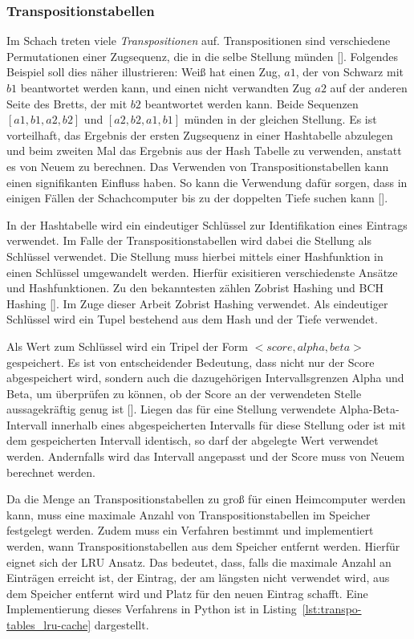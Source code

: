 \subsubsection{Transpositionstabellen} \label{ch:transposition-tables}

Im Schach treten viele \textit{Transpositionen} auf.
Transpositionen sind verschiedene Permutationen einer Zugsequenz, die in die selbe Stellung münden [\cite{Russell2010}].
Folgendes Beispiel soll dies näher illustrieren: Weiß hat einen Zug, $a1$, der von Schwarz mit $b1$ beantwortet werden kann, und einen nicht verwandten Zug $a2$ auf der anderen Seite des Bretts, der mit $b2$ beantwortet werden kann.
Beide Sequenzen $[a1, b1, a2, b2]$ und $[a2, b2, a1, b1]$ münden in der gleichen Stellung.
Es ist vorteilhaft, das Ergebnis der ersten Zugsequenz in einer Hashtabelle abzulegen und beim zweiten Mal das Ergebnis aus der Hash Tabelle zu verwenden, anstatt es von Neuem zu berechnen.
Das Verwenden von Transpositionstabellen kann einen signifikanten Einfluss haben.
So kann die Verwendung dafür sorgen, dass in einigen Fällen der Schachcomputer bis zu der doppelten Tiefe suchen kann [\cite{Russell2010}].

In der Hashtabelle wird ein eindeutiger Schlüssel zur Identifikation eines Eintrags verwendet.
Im Falle der Transpositionstabellen wird dabei die Stellung als Schlüssel verwendet.
Die Stellung muss hierbei mittels einer Hashfunktion in einen Schlüssel umgewandelt werden.
Hierfür exisitieren verschiedenste Ansätze und Hashfunktionen.
Zu den bekanntesten zählen Zobrist Hashing und BCH Hashing [\cite{Wiki2020}].
Im Zuge dieser Arbeit Zobrist Hashing verwendet.
Als eindeutiger Schlüssel wird ein Tupel bestehend aus dem Hash und der Tiefe verwendet.

Als Wert zum Schlüssel wird ein Tripel der Form $<score, alpha, beta>$ gespeichert.
Es ist von entscheidender Bedeutung, dass nicht nur der Score abgespeichert wird, sondern auch die dazugehörigen Intervallsgrenzen Alpha und Beta, um überprüfen zu können, ob der Score an der verwendeten Stelle aussagekräftig genug ist [\cite{Wiki2020}].
Liegen das für eine Stellung verwendete Alpha-Beta-Intervall innerhalb eines abgespeicherten Intervalls für diese Stellung oder ist mit dem gespeicherten Intervall identisch, so darf der abgelegte Wert verwendet werden.
Andernfalls wird das Intervall angepasst und der Score muss von Neuem berechnet werden.

Da die Menge an Transpositionstabellen zu groß für einen Heimcomputer werden kann, muss eine maximale Anzahl von Transpositionstabellen im Speicher festgelegt werden.
Zudem muss ein Verfahren bestimmt und implementiert werden, wann Transpositionstabellen aus dem Speicher entfernt werden.
Hierfür eignet sich der \ac{LRU} Ansatz.
Das bedeutet, dass, falls die maximale Anzahl an Einträgen erreicht ist, der Eintrag, der am längsten nicht verwendet wird, aus dem Speicher entfernt wird und Platz für den neuen Eintrag schafft.
Eine Implementierung dieses Verfahrens in Python ist in Listing~\ref{lst:transpo-tables_lru-cache} dargestellt.

